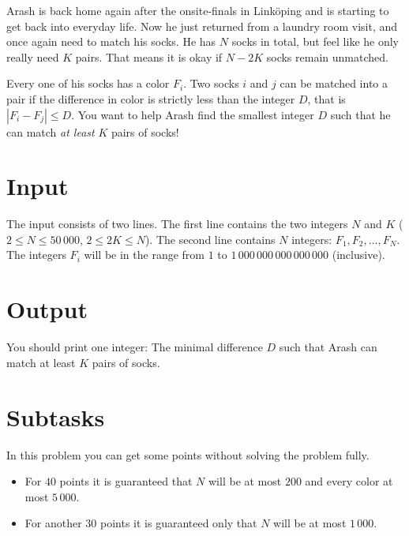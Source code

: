 
Arash is back home again after the onsite-finals in Linköping and is starting to get back into everyday life.
Now he just returned from a laundry room visit, and once again need to match his socks.
He has $N$ socks in total, but feel like he only really need $K$ pairs.
That means it is okay if $N-2K$ socks remain unmatched.

Every one of his socks has a color $F_i$. Two socks $i$ and $j$ can be matched into a pair
if the difference in color is strictly less than the integer $D$, that is $|F_i - F_j| \le D$.
You want to help Arash find the smallest integer $D$ such that he can match \textit{at least} $K$ pairs of socks!

\section*{Input}

The input consists of two lines.
The first line contains the two integers $N$ and $K$ ($2 \leq N \leq 50\,000$, $2 \leq 2K \leq N$).
The second line contains $N$ integers: $F_1, F_2, \dots, F_N$. The integers $F_i$ will be in the range from $1$
to $1\,000\,000\,000\,000\,000$ (inclusive).

\section*{Output}

You should print one integer: The minimal difference $D$ such that Arash can match at least $K$ pairs of socks.

\section*{Subtasks}

In this problem you can get some points without solving the problem fully.

\begin{itemize}
    \item For $40$ points it is guaranteed that $N$ will be at most $200$ and every color at most $5\,000$.
    \item For another $30$ points it is guaranteed only that $N$ will be at most $1\,000$.
\end{itemize}
